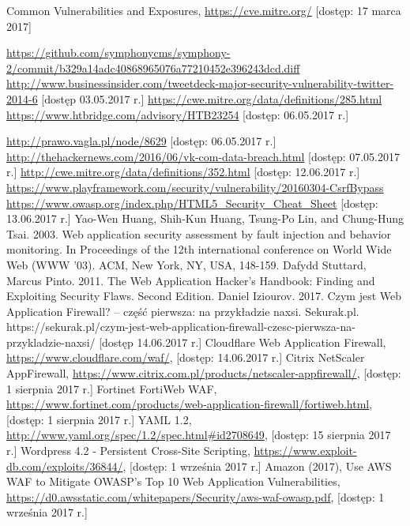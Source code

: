 \documentclass[11pt,a4paper,polish,thesis]{dcsbook}
\begin{document}
\begin{thebibliography}{1}
 Common Vulnerabilities and Exposures, \url{https://cve.mitre.org/} [dostęp: 17 marca 2017]

 \url{https://github.com/symphonycms/symphony-2/commit/b329a14adc40868965076a77210452e396243dcd.diff}
 \url{http://www.businessinsider.com/tweetdeck-major-security-vulnerability-twitter-2014-6} [dostęp 03.05.2017 r.]
 \url{https://cwe.mitre.org/data/definitions/285.html}
 \url{https://www.htbridge.com/advisory/HTB23254} [dostęp: 06.05.2017 r.]

 \url{http://prawo.vagla.pl/node/8629} [dostęp: 06.05.2017 r.]
 \url{http://thehackernews.com/2016/06/vk-com-data-breach.html} [dostęp: 07.05.2017 r.]
 \url{http://cwe.mitre.org/data/definitions/352.html} [dostęp: 12.06.2017 r.]
 \url{https://www.playframework.com/security/vulnerability/20160304-CsrfBypass}
 \url{https://www.owasp.org/index.php/HTML5\_Security\_Cheat\_Sheet} [dostęp: 13.06.2017 r.]
 Yao-Wen Huang, Shih-Kun Huang, Tsung-Po Lin, and Chung-Hung Tsai. 2003. Web application security assessment by fault injection and behavior monitoring. In Proceedings of the 12th international conference on World Wide Web (WWW '03). ACM, New York, NY, USA, 148-159.
 Dafydd Stuttard, Marcus Pinto. 2011. The Web Application Hacker's Handbook: Finding and Exploiting Security Flaws. Second Edition.
 Daniel Iziourov. 2017. Czym jest Web Application Firewall? – część pierwsza: na przykładzie naxsi. Sekurak.pl. https://sekurak.pl/czym-jest-web-application-firewall-czesc-pierwsza-na-przykladzie-naxsi/ [dostęp 14.06.2017 r.]
 Cloudflare Web Application Firewall, \url{https://www.cloudflare.com/waf/}, [dostęp: 14.06.2017 r.]
 Citrix NetScaler AppFirewall, \url{https://www.citrix.com.pl/products/netscaler-appfirewall/}, [dostęp: 1 sierpnia 2017 r.]
 Fortinet FortiWeb WAF, \url{https://www.fortinet.com/products/web-application-firewall/fortiweb.html}, [dostęp: 1 sierpnia 2017 r.]
 YAML 1.2, \url{http://www.yaml.org/spec/1.2/spec.html#id2708649}, [dostęp: 15 sierpnia 2017 r.]
 Wordpress 4.2 - Persistent Cross-Site Scripting, \url{https://www.exploit-db.com/exploits/36844/}, [dostęp: 1 września 2017 r.]
 Amazon (2017), Use AWS WAF to Mitigate OWASP's Top 10 Web Application Vulnerabilities, \url{https://d0.awsstatic.com/whitepapers/Security/aws-waf-owasp.pdf}, [dostęp: 1 września 2017 r.]
\end{thebibliography}
\end{document}
